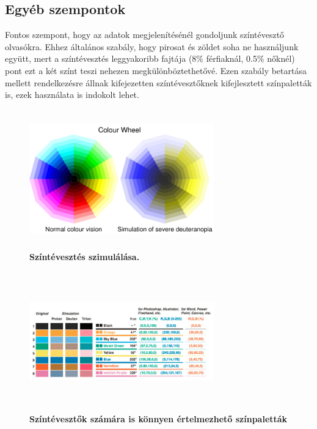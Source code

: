 \documentclass[12pt]{article}
\theoremstyle{plain}
\begin{document}
 \subsection{Egyéb szempontok}
 
 Fontos szempont, hogy az adatok megjelenítésénél gondoljunk  színtévesztő olvasókra. Ehhez általános szabály, hogy pirosat és zöldet soha ne használjunk együtt, mert a színtévesztés leggyakoribb fajtája (8\% férfiaknál, 0.5\% nőknél) pont ezt a két színt teszi nehezen megkülönböztethetővé. Ezen szabály betartása mellett rendelkezésre állnak kifejezetten színtévesztőknek kifejlesztett színpaletták is, ezek használata is indokolt lehet. 
 
 \begin{figure}[H]
    \centering
    \includegraphics[width=8cm, height=6cm]{media/cwheel-polar.png}
    \caption{\textbf{Színtévesztés szimulálása.}}
    \label{fig:GeneralDiagram}
 \end{figure}
 
 \begin{figure}[H]
    \centering
    \includegraphics[width=8cm, height=6cm]{media/colorb.png}
    \caption{\textbf{Színtévesztők számára is könnyen értelmezhető színpaletták}}
    \label{fig:GeneralDiagram}
 \end{figure}
 
 \newline
\end{document}

